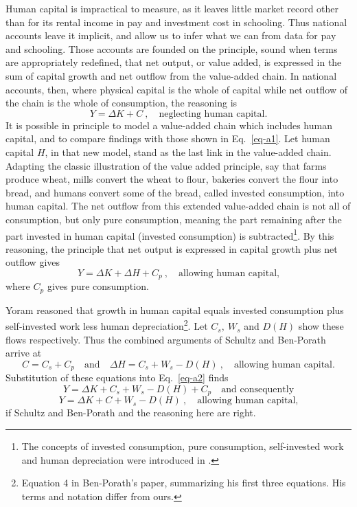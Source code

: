 \documentclass[a4paper,fleqn]{latex_styles/cas-sc}
\begin{document}
Human capital is impractical to measure, as it leaves little market
record other than for its rental income in pay and investment cost in schooling. Thus national accounts
leave it implicit, and allow us to infer what we can from data for pay and schooling. Those
accounts are founded on the principle, sound when terms are appropriately redefined, that net output,
or value added, is expressed in the sum of capital growth and net
outflow from the value-added chain. In national accounts, then, where
physical capital is the whole of capital while net outflow of the chain
is the whole of consumption, the reasoning is
%
\begin{equation}
Y = \Delta K + C \ , \quad \text{neglecting human capital.}\label{eq-a1}
\end{equation}
%
It is possible in principle to model a value-added chain which includes human
capital, and to compare findings with those shown in Eq.~\eqref{eq-a1}.
Let human capital $H$, in that new model, stand as the last link in the
value-added chain. Adapting the classic illustration of the value added
principle, say that farms produce wheat, mills convert the wheat to
flour, bakeries convert the flour into bread, and humans convert some of
the bread, called invested consumption, into human capital. The net
outflow from this extended value-added chain is not all of consumption,
but only pure consumption, meaning the part remaining after the part invested in human capital (invested consumption) is
subtracted\footnote{The concepts of invested consumption, pure consumption, self-invested work and human depreciation were introduced in \cite{schultzInvestmentHumanCapital1961}.}. By this reasoning, the principle
that net output is expressed in capital growth plus net outflow gives
%
\begin{equation} 
Y = \Delta K + \Delta H + C_{p}\ , \quad \text{allowing human capital,}\label{eq-a2} 
\end{equation}
%
where \(C_{p}\) gives pure consumption.

Yoram \citet{ben-porathProductionHumanCapital1967} reasoned
that growth in human capital equals invested consumption plus
self-invested work less human depreciation\footnote{Equation 4 in
  Ben-Porath's paper, summarizing his first three equations. His terms and
  notation differ from ours.}.
Let \(C_{s},\ W_{s}\) and \(D(H)\) show these flows respectively.
Thus the combined arguments of Schultz and Ben-Porath arrive at
%
\begin{equation}
C = C_{s} + C_{p} \quad \text{and}
\quad \Delta H = C_{s} + W_{s} - D(H)\ , \quad \text{allowing human capital.}\label{eq-a3}
\end{equation}
%
Substitution of these equations into Eq.~\eqref{eq-a2} finds
%
\[Y = \Delta K + C_{s} + W_{s} - D(H) + C_{p} \quad \text{and consequently}\]
%
\vspace{-5ex}
\begin{equation}
    Y = \Delta K + C + W_{s} - D(H)\ , \quad \text{allowing human capital,}\label{eq-a4}
\end{equation}
%
if Schultz and Ben-Porath and the reasoning here are right.
\end{document}
